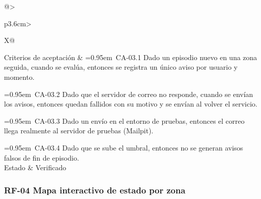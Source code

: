 \documentclass[11pt,a4paper,oneside]{article}
\begin{document}
\begin{xltabular}{\textwidth}{@{}>{\sffamily\bfseries\small\raggedright\arraybackslash}p{3.6cm}>{\small\raggedright\arraybackslash}X@{}}
Criterios de aceptación & \hangindent=0.95em\textbullet\ CA-03.1 Dado un episodio nuevo en una zona seguida, cuando se evalúa, entonces se registra un único aviso por usuario y momento.\par \hangindent=0.95em\textbullet\ CA-03.2 Dado que el servidor de correo no responde, cuando se envían los avisos, entonces quedan fallidos con su motivo y se envían al volver el servicio.\par \hangindent=0.95em\textbullet\ CA-03.3 Dado un envío en el entorno de pruebas, entonces el correo llega realmente al servidor de pruebas (Mailpit).\par \hangindent=0.95em\textbullet\ CA-03.4 Dado que se sube el umbral, entonces no se generan avisos falsos de fin de episodio.\\ \hline
Estado & Verificado\\ \hline
\end{xltabular}
\vspace{0.8em}

\subsubsection{RF-04 Mapa interactivo de estado por zona}
\end{document}
